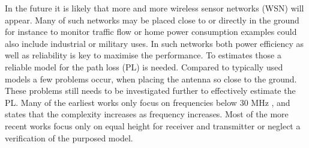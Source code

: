 
In the future it is likely that more and more wireless sensor networks (WSN) will appear. Many of such networks may be placed close to or directly in the ground for instance to monitor traffic flow or home power consumption examples could also include industrial or military uses. In such networks both power efficiency as well as reliability is key to maximise the performance. To estimates those a reliable model for the path loss (PL) is needed. Compared to typically used models a few problems occur, when placing the antenna so close to the ground. These problems still needs to be investigated further to effectively estimate the PL. Many of the earliest works only focus on frequencies below 30 MHz \cite{Bullington}, and states that the complexity increases as frequency increases. Most of the more recent works focus only on equal height for receiver and transmitter or neglect a verification of the purposed model. 


